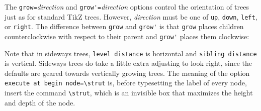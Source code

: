 \documentclass{article}
\begin{document}
The \verb|grow=|\textit{direction}\/ and \verb|grow'=|\textit{direction}\/ options control the orientation of trees just as for standard TikZ trees. However, \textit{direction}\/ must be one of \verb|up|, \verb|down|, \verb|left|, or \verb|right|. The difference between \verb|grow| and \verb|grow'| is that \verb|grow| places children counterclockwise with respect to their parent and \verb|grow'| places them clockwise:
\begin{center}
\begin{SideBySideExample}
%
\end{SideBySideExample}
\vspace{3ex}
\begin{SideBySideExample}
\end{SideBySideExample}
\end{center}
Note that in sideways trees, \verb|level distance| is horizontal and \verb|sibling distance| is vertical. Sideways trees do take a little extra adjusting to look right, since the defaults are geared towards vertically growing trees. The meaning of the option \verb|execute at begin node=\strut| is, before typesetting the label of every node, insert the command \verb|\strut|, which is an invisible box that maximizes the height and depth of the node.
\end{document}
